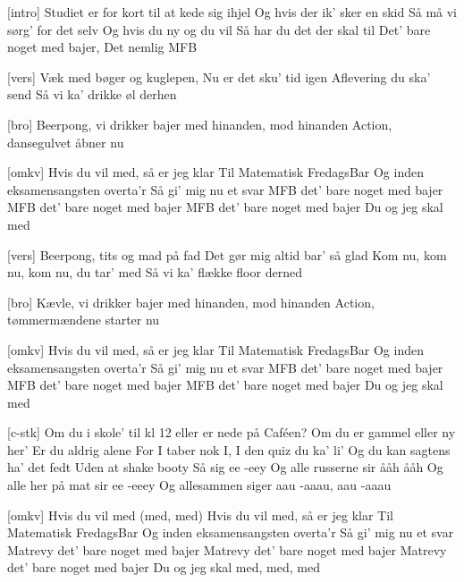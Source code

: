 \documentclass[a4paper,11pt]{article}
\begin{document}
\begin{song}
[intro] Studiet er for kort til at kede sig ihjel
Og hvis der ik' sker en skid
Så må vi sørg' for det selv 
 Og hvis du ny og du vil
Så har du det der skal til
 Det' bare noget med bajer, 
Det nemlig MFB

[vers] Væk med bøger og kuglepen,
Nu er det sku' tid igen
 Aflevering du ska' send
Så vi ka' drikke øl derhen

[bro] Beerpong, vi drikker bajer med hinanden, mod hinanden 
Action, dansegulvet åbner nu

[omkv]%
Hvis du vil med, så er jeg klar
Til Matematisk FredagsBar
Og inden eksamensangsten overta'r
Så gi' mig nu et svar
MFB det' bare noget med bajer
MFB det' bare noget med bajer
MFB det' bare noget med bajer
Du og jeg skal med

[vers] Beerpong, tits og mad på fad
Det gør mig altid bar' så glad
 Kom nu, kom nu, kom nu, du tar' med
Så vi ka' flække floor derned 

[bro]%
Kævle, vi drikker bajer med hinanden, mod hinanden 
Action, tømmermændene starter nu

[omkv]%
Hvis du vil med, så er jeg klar
Til Matematisk FredagsBar
Og inden eksamensangsten overta'r
Så gi' mig nu et svar
MFB det' bare noget med bajer
MFB det' bare noget med bajer
MFB det' bare noget med bajer
Du og jeg skal med

[c-stk] Om du i skole' til kl 12
eller er nede på Caféen?
 Om du er gammel eller ny her'
Er du aldrig alene
 For I taber nok I, I den quiz du ka' li'
 Og du kan sagtens ha' det fedt
Uden at shake booty
 Så sig ee -eey
 Og alle russerne sir ååh ååh
 Og alle her på mat sir ee -eeey
 Og allesammen siger aau -aaau, aau -aaau

[omkv]%
Hvis du vil med (med, med)
Hvis du vil med, så er jeg klar
Til Matematisk FredagsBar
Og inden eksamensangsten overta'r
Så gi' mig nu et svar
Matrevy det' bare noget med bajer
Matrevy det' bare noget med bajer
Matrevy det' bare noget med bajer
Du og jeg skal med, med, med
\end{song}
\end{document}
